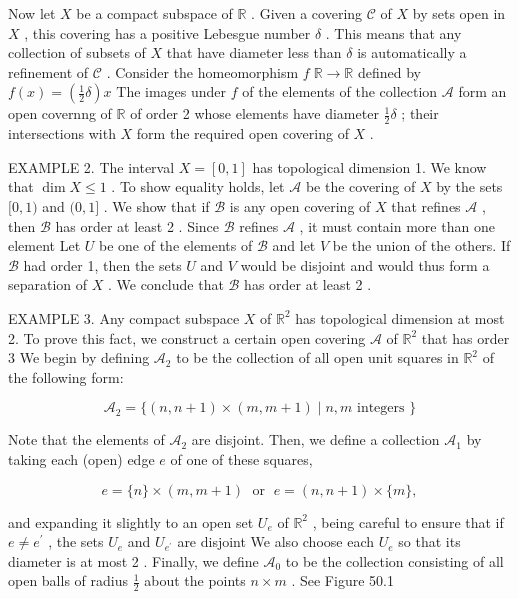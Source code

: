 \documentclass[10pt]{article}
\begin{document}
Now let \(X\) be a compact subspace of \(\mathbb{R}\) . Given a covering \(\mathcal{C}\) of \(X\) by sets open in \(X\) , this covering has a positive Lebesgue number \(\delta\) . This means that any collection of subsets of \(X\) that have diameter less than \(\delta\) is automatically a refinement of \(\mathcal{C}\) . Consider the homeomorphism \(f\;\mathbb{R} \rightarrow  \mathbb{R}\) defined by \(f\left( x\right)  = \left( {\frac{1}{2}\delta }\right) x\) The images under \(f\) of the elements of the collection \(\mathcal{A}\) form an open covernng of \(\mathbb{R}\) of order 2 whose elements have diameter \(\frac{1}{2}\delta\) ; their intersections with \(X\) form the required open covering of \(X\) .

EXAMPLE 2. The interval \(X = \left\lbrack  {0,1}\right\rbrack\) has topological dimension 1. We know that \(\dim X \leq  1\) . To show equality holds, let \(\mathcal{A}\) be the covering of \(X\) by the sets \(\lbrack 0,1)\) and \((0,1\rbrack\) . We show that if \(\mathcal{B}\) is any open covering of \(X\) that refines \(\mathcal{A}\) , then \(\mathcal{B}\) has order at least 2 . Since \(\mathcal{B}\) refines \(\mathcal{A}\) , it must contain more than one element Let \(U\) be one of the elements of \(\mathcal{B}\) and let \(V\) be the union of the others. If \(\mathcal{B}\) had order 1, then the sets \(U\) and \(V\) would be disjoint and would thus form a separation of \(X\) . We conclude that \(\mathcal{B}\) has order at least 2 .

EXAMPLE 3. Any compact subspace \(X\) of \({\mathbb{R}}^{2}\) has topological dimension at most 2. To prove this fact, we construct a certain open covering \(\mathcal{A}\) of \({\mathbb{R}}^{2}\) that has order 3 We begin by defining \({\mathcal{A}}_{2}\) to be the collection of all open unit squares in \({\mathbb{R}}^{2}\) of the following form:

\[
{\mathcal{A}}_{2} = \{ \left( {n,n + 1}\right)  \times  \left( {m,m + 1}\right)  \mid  n,m\text{ integers }\}
\]

Note that the elements of \({\mathcal{A}}_{2}\) are disjoint. Then, we define a collection \({\mathcal{A}}_{1}\) by taking each (open) edge \(e\) of one of these squares,

\[
e = \{ n\}  \times  \left( {m,m + 1}\right) \;\text{ or }\;e = \left( {n,n + 1}\right)  \times  \{ m\} ,
\]

and expanding it slightly to an open set \({U}_{e}\) of \({\mathbb{R}}^{2}\) , being careful to ensure that if \(e \neq  {e}^{\prime }\) , the sets \({U}_{e}\) and \({U}_{{e}^{\prime }}\) are disjoint We also choose each \({U}_{e}\) so that its diameter is at most 2 . Finally, we define \({\mathcal{A}}_{0}\) to be the collection consisting of all open balls of radius \(\frac{1}{2}\) about the points \(n \times  m\) . See Figure 50.1
\end{document}
